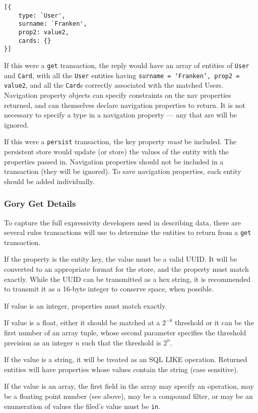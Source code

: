 \documentclass{article}
\newcommand{\ilcode}{\tt}
\begin{document}
\linespread{1}
\begin{lstlisting}
[{
	type: `User',
	surname: `Franken',
	prop2: value2,
	cards: {}
}]
\end{lstlisting}
\linespread{1.6}

If this were a {\ilcode get} transaction, the reply would have an array of
entities of {\ilcode User} and {\ilcode Card}, with all the {\ilcode User}
entities having {\ilcode surname = `Franken', prop2 = value2}, and all the
{\ilcode Card}s correctly associated with the matched Users.  Navigation
property objects can specify constraints on the nav properties returned, and can
themselves declare navigation properties to return. It is not necessary to
specify a type in a navigation property --- any that are will be ignored.

If this were a {\ilcode persist} transaction, the key property {\it must} be
included. The persistent store would update (or store) the values of the entity
with the properties passed in. Navigation properties should not be included in a
transaction (they will be ignored). To save navigation properties, each entity
should be added individually.

\subsubsection{Gory Get Details}
To capture the full expressivity developers need in describing data, there are
several rules transactions will use to determine the entities to return from a
{\ilcode get} transaction.

If the property is the entity key, the value must be a valid UUID. It will be
converted to an appropriate format for the store, and the property must match
exactly. While the UUID can be transmitted as a hex string, it is recommended to
transmit it as a 16-byte integer to conserve space, when possible.

If value is an integer, properties must match exactly.

If value is a float, either it should be matched at a $2^{-8}$ threshold or it
can be the first number of an array tuple, whose second parameter specifies the
threshold precision as an integer $n$ such that the threshold is $2^{n}$.

If the value is a string, it will be treated as an SQL LIKE operation.
Returned entities will have properties whose values contain the string (case
sensitive).

If the value is an array, the first field in the array may specify an operation,
may be a floating point number (see above), may be a compound filter, or may be
an enumeration of values the filed's value must be {\ilcode in}.
\end{document}
